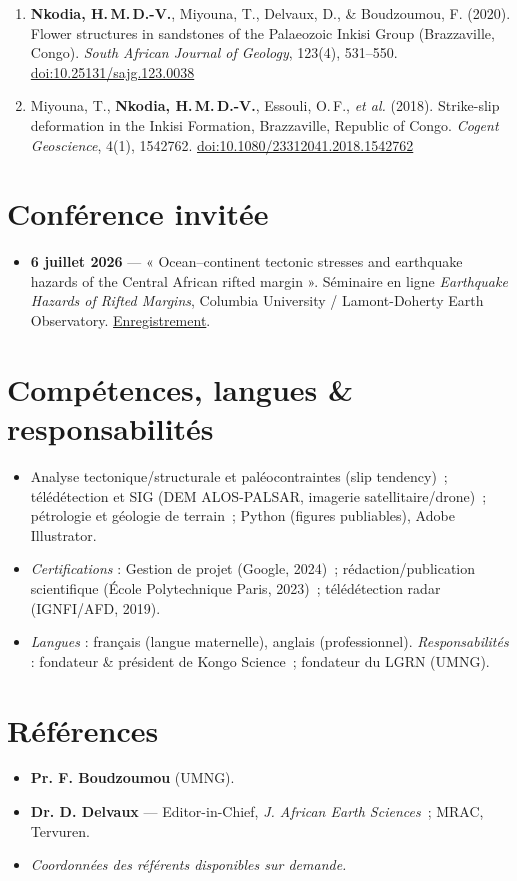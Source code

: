 \documentclass[10.5pt,a4paper]{article}
\begin{document}
\begin{enumerate}[leftmargin=1.5em, itemsep=2pt, topsep=2pt, label=\arabic*.]
\item \textbf{Nkodia, H.\,M.\,D.-V.}, Miyouna, T., Delvaux, D., \& Boudzoumou, F. (2020). Flower structures in sandstones of the Palaeozoic Inkisi Group (Brazzaville, Congo). \emph{South African Journal of Geology}, 123(4), 531–550. \href{https://doi.org/10.25131/sajg.123.0038}{doi:10.25131/sajg.123.0038}
\item Miyouna, T., \textbf{Nkodia, H.\,M.\,D.-V.}, Essouli, O.\,F., \emph{et al.} (2018). Strike-slip deformation in the Inkisi Formation, Brazzaville, Republic of Congo. \emph{Cogent Geoscience}, 4(1), 1542762. \href{https://doi.org/10.1080/23312041.2018.1542762}{doi:10.1080/23312041.2018.1542762}
\end{enumerate}

\section{Conférence invitée}
\begin{itemize}
\item \textbf{6 juillet 2026} — « Ocean–continent tectonic stresses and earthquake hazards of the Central African rifted margin ». Séminaire en ligne \emph{Earthquake Hazards of Rifted Margins}, Columbia University / Lamont-Doherty Earth Observatory. \href{https://www.youtube.com/watch?v=lnRf0Jz0QbM}{Enregistrement}.
\end{itemize}

\section{Compétences, langues \& responsabilités}
\begin{itemize}
\item Analyse tectonique/structurale et paléocontraintes (slip tendency)~; télédétection et SIG (DEM ALOS-PALSAR, imagerie satellitaire/drone)~; pétrologie et géologie de terrain~; Python (figures publiables), Adobe Illustrator.
\item \textit{Certifications} : Gestion de projet (Google, 2024)~; rédaction/publication scientifique (École Polytechnique Paris, 2023)~; télédétection radar (IGNFI/AFD, 2019).
\item \textit{Langues} : français (langue maternelle), anglais (professionnel). \quad \textit{Responsabilités} : fondateur \& président de Kongo Science~; fondateur du LGRN (UMNG).
\end{itemize}

\section{Références}
\begin{itemize}
\item \textbf{Pr. F. Boudzoumou} (UMNG).
\item \textbf{Dr. D. Delvaux} — Editor-in-Chief, \emph{J. African Earth Sciences}~; MRAC, Tervuren.
\item \emph{Coordonnées des référents disponibles sur demande.}
\end{itemize}
\end{document}
